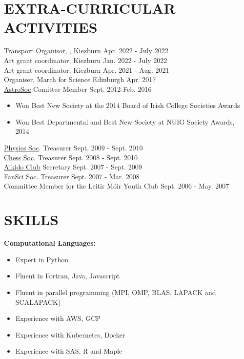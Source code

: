\documentclass[margin, 10pt]{res} %
\begin{document}
\begin{resume}

\section{EXTRA-CURRICULAR \\ ACTIVITIES} 
Transport Organisor, , \href{https://kiezburn.org/}{Kiezburn} \hfill Apr. 2022 - July 2022 \\
Art grant coordinator, Kiezburn \hfill Jan. 2022 - July 2022 \\
Art grant coordinator,  Kiezburn \hfill Apr. 2021 - Aug. 2021 \\
Organiser, March for Science Edinburgh \hfill Apr. 2017 \\
\href{http://www.socs.nuigalway.ie/society_profiles/view/447}{AstroSoc} Comittee Member \hfill Sept. 2012-Feb. 2016
\begin{itemize}\itemsep -2pt
 \item Won Best New Society at the 2014 Board of Irish College Societies Awards
 \item Won Best Departmental and Best New Society at NUIG Society Awards, 2014
\end{itemize}
\href{http://www.socs.nuigalway.ie/society_profiles/view/73}{Physics Soc}. Treasurer \hfill Sept. $2009$ - Sept. $2010$ \\
\href{http://www.socs.nuigalway.ie/society_profiles/view/25}{Chess Soc}. Treasurer \hfill Sept. 2008 - Sept. 2010\\
\href{http://www.clubs.nuigalway.ie/club/293/aikido}{Aikido Club} Secretary \hfill Sept. 2007 - Sept. 2009 \\
\href{http://www.socs.nuigalway.ie/society_profiles/view/42}{FanSci Soc}. Treasurer \hfill Sept. 2007 - Mar. 2008 \\
Committee Member for the Leitir M\'oir Youth Club \hfill Sept. 2006 - May. 2007

\section{SKILLS} 
{\bf Computational Languages:} 
\begin{itemize} \itemsep -2pt
 \item Expert in Python
 \item Fluent in Fortran, Java, Javascript
 \item Fluent in parallel programming (MPI, OMP,  BLAS, LAPACK and SCALAPACK)
 \item Experience with AWS, GCP
 \item Experience with Kubernetes, Docker
 \item Experience with SAS, R and Maple
\end{itemize}


\end{resume}
\end{document}

